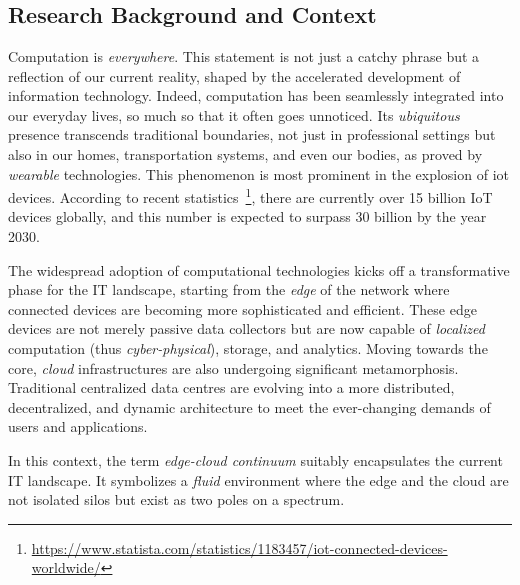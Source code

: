 \chapter{\introductionname}\label{chap:introduction}\mtcaddchapter
\minitoc%
\begin{refsection}
\section{Research Background and Context}
Computation is \textit{everywhere}. 
 This statement is not just a catchy phrase but a reflection of our current reality, 
 shaped by the accelerated development of information technology. 
 Indeed, computation has been seamlessly integrated into our everyday lives, 
 so much so that it often goes unnoticed. 
%
Its \emph{ubiquitous} presence transcends traditional boundaries, 
 not just in professional settings but also in our homes, transportation systems, 
 and even our bodies, as proved by \emph{wearable} technologies. 
% 
This phenomenon is most prominent in the explosion of \ac{iot} devices. 
 According to recent statistics~\footnote{\url{https://www.statista.com/statistics/1183457/iot-connected-devices-worldwide/}}, 
 there are currently over 15 billion IoT devices globally, 
 and this number is expected to surpass 30 billion by the year 2030.

The widespread adoption of computational technologies kicks off a transformative phase for the IT landscape, 
 starting from the \emph{edge} of the network where connected devices are becoming more sophisticated and efficient. 
 These edge devices are not merely passive data collectors but are now capable of \emph{localized} computation  (thus \emph{cyber-physical}), storage, and analytics. 
Moving towards the core, 
 \emph{cloud} infrastructures are also undergoing significant metamorphosis. 
 Traditional centralized data centres are evolving into a more distributed,
 decentralized, and dynamic architecture to meet the ever-changing demands of users and applications.

In this context, the term \emph{edge-cloud continuum} suitably encapsulates the current IT landscape. 
 It symbolizes a \emph{fluid} environment where the edge and the cloud are not isolated silos but exist as two poles on a spectrum. 


\end{refsection}
